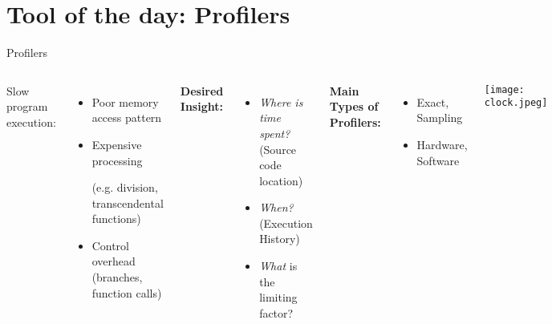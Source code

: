\documentclass[english,compress]{beamer}
\begin{document}
\section[Profilers]{Tool of the day: Profilers}
\begin{frame}{Profilers}
  \begin{columns}
      Slow program execution:
      \begin{itemize}
        \item Poor memory access pattern
        \item Expensive processing 

        (e.g. division, transcendental functions)
        \item Control overhead (branches, function calls)
      \end{itemize}
      \textbf{Desired Insight:}
      \begin{itemize}
        \item \emph{Where is time spent?} (Source code location)
        \item \emph{When?} (Execution History)
        \item \emph{What} is the limiting factor?
      \end{itemize}

      \textbf{Main Types of Profilers:}
      \begin{itemize}
        \item Exact, Sampling
        \item Hardware, Software
      \end{itemize}
      \texttt{[image: clock.jpeg]}
  \end{columns}
\end{frame}
\end{document}
